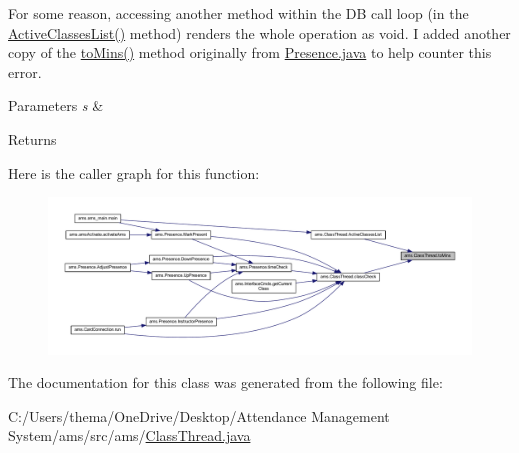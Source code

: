 For some reason, accessing another method within the DB call loop (in the \mbox{\hyperlink{classams_1_1_class_thread_addadbfedff6d9cc822345caa787ad587}{Active\+Classes\+List()}} method) renders the whole operation as void. I added another copy of the \mbox{\hyperlink{classams_1_1_class_thread_a6cf57979f8aee94a4b4c5d46525bb76d}{to\+Mins()}} method originally from \mbox{\hyperlink{_presence_8java}{Presence.\+java}} to help counter this error. 
\begin{DoxyParams}{Parameters}
{\em s} & \\
\hline
\end{DoxyParams}
\begin{DoxyReturn}{Returns}

\end{DoxyReturn}
Here is the caller graph for this function\+:\nopagebreak
\begin{figure}[H]
\begin{center}
\leavevmode
\includegraphics[width=350pt]{classams_1_1_class_thread_a6cf57979f8aee94a4b4c5d46525bb76d_icgraph}
\end{center}
\end{figure}


The documentation for this class was generated from the following file\+:\begin{DoxyCompactItemize}
\item 
C\+:/\+Users/thema/\+One\+Drive/\+Desktop/\+Attendance Management System/ams/src/ams/\mbox{\hyperlink{_class_thread_8java}{Class\+Thread.\+java}}\end{DoxyCompactItemize}
